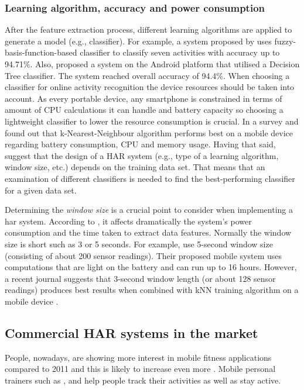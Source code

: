         \subsubsection{Learning algorithm, accuracy and power consumption}
        \label{section:learning_alg_accuracy_power_consm}
        After the feature extraction process, different learning algorithms are applied to generate a model (e.g., classifier). For example, a system proposed by \citet[116]{kao2009} uses fuzzy-basis-function-based classifier to classify seven activities with accuracy up to 94.71\%. Also, \citet[918]{anjum2013} proposed a system on the Android platform that utilised a Decision Tree classifier. The system reached overall accuracy of 94.4\%. When choosing a classifier for online activity recognition the device resources should be taken into account. As every portable device, any smartphone is constrained in terms of amount of CPU calculations it can handle and battery capacity so choosing a lightweight classifier to lower the resource consumption is crucial. In a survey \citet[2068]{shoaib2015} and \citet[226]{ayu2012} found out that k-Nearest-Neighbour algorithm performs best on a mobile device regarding battery consumption, CPU and memory usage. Having that said, \citet[1193]{lara2013} suggest that the design of a HAR system (e.g., type of a learning algorithm, window size, etc.) depends on the training data set. That means that an examination of different classifiers is needed to find the best-performing classifier for a given data set.
        
        Determining the \textit{window size} is a crucial point to consider when implementing a \gls{har} system. According to \citet[2]{torreshuitzil2015a}, it affects dramatically the system’s power consumption and the time taken to extract data features. Normally the window size is short such as 3 or 5 seconds. For example, \citet[3]{torreshuitzil2015a} use 5-second window size (consisting of about 200 sensor readings). Their proposed mobile system uses computations that are light on the battery and can run up to 16 hours. However, a recent journal suggests that 3-second window length (or about 128 sensor readings) produces best results when combined with kNN training algorithm on a mobile device \citep[126-136]{bashir2016}. 
        
    \subsection{Commercial HAR systems in the market}
    \label{section:commercial-har-systems}
    People, nowadays, are showing more interest in mobile fitness applications compared to 2011 and this is likely to increase even more \citep{googletrends}. Mobile personal trainers such as \citet[]{endomondo2017}, \citet[]{fitnesskeeper2017} and \citet[]{human2017}  help people track their activities as well as stay active.
    
